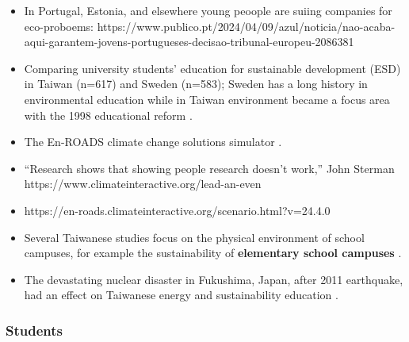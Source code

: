\documentclass[
  letterpaper,
  DIV=11,
  numbers=noendperiod]{scrartcl}
\begin{document}
\begin{itemize}
\item
  In Portugal, Estonia, and elsewhere young peoople are suiing companies
  for eco-proboems:
  https://www.publico.pt/2024/04/09/azul/noticia/nao-acaba-aqui-garantem-jovens-portugueses-decisao-tribunal-europeu-2086381
\item
  Comparing university students' education for sustainable development
  (ESD) in Taiwan (n=617) and Sweden (n=583); Sweden has a long history
  in environmental education while in Taiwan environment became a focus
  area with the 1998 educational reform
  \citet{berglundCrossculturalComparativeStudy2020}.
\item
  The En-ROADS climate change solutions simulator
  \citep{czaikaModelUseSustainability2017, creutzigEngageDonPreach2020, climateinteractiveLIVECOP28EnROADS2023}.
\item
  ``Research shows that showing people research doesn't work,'' John
  Sterman https://www.climateinteractive.org/lead-an-even
\item
  https://en-roads.climateinteractive.org/scenario.html?v=24.4.0
\end{itemize}

\begin{itemize}
\item
  Several Taiwanese studies focus on the physical environment of school
  campuses, for example the sustainability of \textbf{elementary school
  campuses} \citep{YanJiu2006}.
\item
  The devastating nuclear disaster in Fukushima, Japan, after 2011
  earthquake, had an effect on Taiwanese energy and sustainability
  education \citep{TiChuTan2011}.
\end{itemize}

\subsubsection{Students}\label{students}
\end{document}
